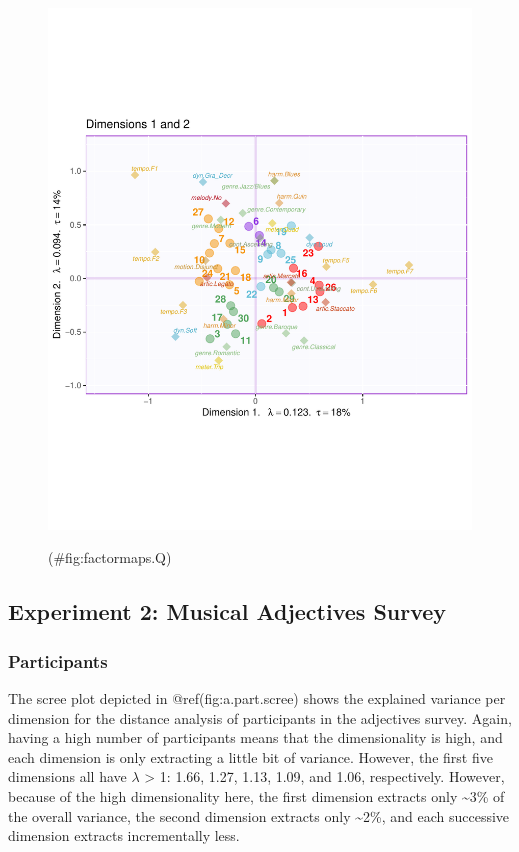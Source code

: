 \documentclass[
  english,
  man,floatsintext]{apa6}
\begin{document}
\begin{figure}

{\centering \includegraphics[width=1\linewidth]{Music-Descriptor-Space_files/figure-latex/factormaps.Q-1} 

}

\caption{ }(\#fig:factormaps.Q)
\end{figure}

\hypertarget{experiment-2-musical-adjectives-survey}{%
\subsection{Experiment 2: Musical Adjectives Survey}\label{experiment-2-musical-adjectives-survey}}

\hypertarget{participants-2}{%
\subsubsection{Participants}\label{participants-2}}

The scree plot depicted in @ref(fig:a.part.scree) shows the explained variance per dimension for the distance analysis of participants in the adjectives survey. Again, having a high number of participants means that the dimensionality is high, and each dimension is only extracting a little bit of variance. However, the first five dimensions all have \(\lambda\) \textgreater{} 1: 1.66, 1.27, 1.13, 1.09, and 1.06, respectively. However, because of the high dimensionality here, the first dimension extracts only \textasciitilde3\% of the overall variance, the second dimension extracts only \textasciitilde2\%, and each successive dimension extracts incrementally less.
\end{document}
